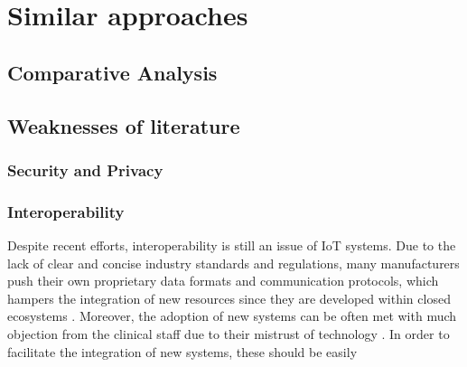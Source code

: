 \section{Similar approaches}



\subsection{Comparative Analysis}


\subsection{Weaknesses of literature}

\subsubsection{Security and Privacy}


\subsubsection{Interoperability}

Despite recent efforts, interoperability is still an issue of IoT systems. Due to the lack of clear and concise industry standards and regulations, many manufacturers push their own proprietary data formats and communication protocols, which hampers the integration of new resources since they are developed within closed ecosystems \cite{Rubi2019}. 
Moreover, the adoption of new systems can be often met with much objection from the clinical staff due to their mistrust of technology \cite{DursunErgezen2020}. 
In order to facilitate the integration of new systems, these should be easily 




